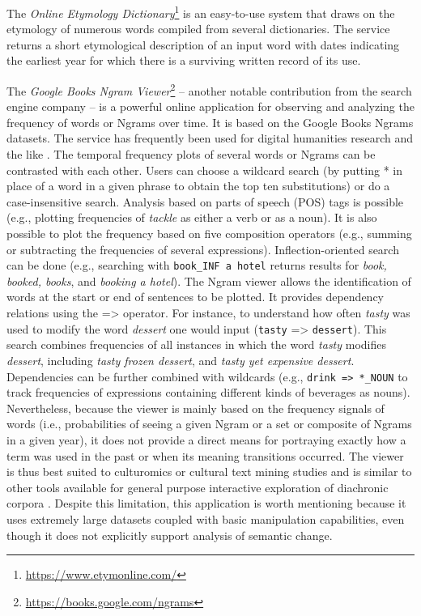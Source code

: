 \documentclass[output=paper]{langsci/langscibook}
\begin{document}
The \emph{Online Etymology Dictionary}\footnote{\url{https://www.etymonline.com/}} is an easy-to-use system that draws on the etymology of numerous words compiled from several dictionaries. The service returns a short etymological description of an input word with dates indicating the earliest year for which there is a surviving written record of its use. 

The \emph{Google Books Ngram Viewer}\footnote{\url{https://books.google.com/ngrams}} \citep{michel2011quantitative} -- another notable contribution from the search engine company -- is a powerful online application for observing and analyzing the frequency of words or Ngrams over time. It is based on the Google Books Ngrams datasets. The service has frequently been used for digital humanities research and the like \citep[e.g.][]{michel2011quantitative,acerbi-etal-2013,bentley-etal-2014,pechenick-etal-2015,iliev-etal-2016}. The temporal frequency plots of several words or Ngrams can be contrasted with each other. Users can choose a wildcard search (by putting * in place of a word in a given phrase to obtain the top ten substitutions) or do a case-insensitive search. Analysis based on parts of speech (POS) tags is possible (e.g., plotting frequencies of \emph{tackle} as either a verb or as a noun). It is also possible to plot the frequency based on five composition operators (e.g., summing or subtracting the frequencies of several expressions). Inflection-oriented search can be done (e.g., searching with \texttt{\mbox{book\_INF} a hotel} returns results for \emph{book, booked, books}, and \emph{booking a hotel}). The Ngram viewer allows the identification of words at the start or end of sentences to be plotted. 
It provides dependency relations using the => operator. For instance, to understand how often \emph{tasty} was used to modify the word \emph{dessert} one would input (\texttt{tasty} => \texttt{dessert}). This search combines frequencies of all instances in which the word \emph{tasty} modifies \emph{dessert}, including \emph{tasty frozen dessert}, and \emph{tasty yet expensive dessert}. Dependencies can be further combined with wildcards (e.g., \texttt{drink => *\_NOUN} to track frequencies of expressions containing different kinds of beverages as nouns). 
Nevertheless, because the viewer is mainly based on the frequency signals of words (i.e., probabilities of seeing a given Ngram or a set or composite of Ngrams in a given year), it does not provide a direct means for portraying exactly how a term was used in the past or when its meaning transitions occurred. The viewer is thus best suited to culturomics or cultural text mining studies and is similar to other tools available for general purpose interactive exploration of diachronic corpora \citep[e.g.][]{michel2011quantitative,odijk2012time,eijnatten2014using,jatowt2016historycomparator}. Despite this limitation, this application is worth mentioning because it uses extremely large datasets coupled with basic manipulation capabilities,  even though it does not explicitly support  analysis of semantic change.
\end{document}
